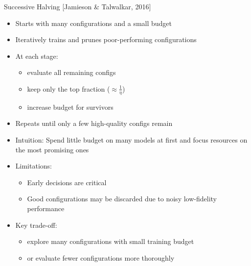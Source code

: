\documentclass[t,english]{beamer}
\newcommand{\citeref}[1]{{\color{rwth-blue-75}\small[#1]}}
\begin{document}
\begin{frame}{Successive Halving \citeref{Jamieson \& Talwalkar, 2016}}
  \begin{itemize}[<+->]
    \item Starts with many configurations and a small budget
    \item Iteratively trains and prunes poor-performing configurations
    \item At each stage:
    \begin{itemize}
      \item evaluate all remaining configs
      \item keep only the top fraction ($\approx \frac{1}{\eta}$)
      \item increase budget for survivors
    \end{itemize}
    \item Repeats until only a few high-quality configs remain
    \item Intuition: Spend little budget on many models at first and focus resources on the most promising ones
    \item Limitations:
    \begin{itemize}
      \item Early decisions are critical
      \item Good configurations may be discarded due to noisy low-fidelity performance
    \end{itemize}
    \item Key trade-off:
    \begin{itemize}
      \item explore many configurations with small training budget
      \item or evaluate fewer configurations more thoroughly
    \end{itemize}
  \end{itemize}
\end{frame}
\end{document}
